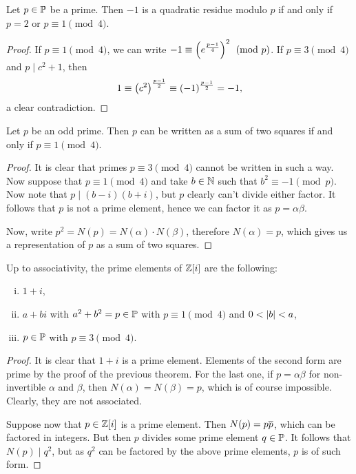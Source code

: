 \obvs

\begin{lema}
Let $p \in \P$ be a prime. Then $-1$ is a quadratic residue modulo
$p$ if and only if $p = 2$ or $p \equiv 1 \pmod{4}$.
\end{lema}

\begin{proof}
If $p \equiv 1 \pmod{4}$, we can write
$-1 \equiv \br{e^{\frac{p-1}{4}}}^2 \pmod{p}$.
If $p \equiv 3 \pmod{4}$ and $p \mid c^2 + 1$, then
\[
1 \equiv \br{c^2}^{\frac{p-1}{2}} \equiv (-1)^{\frac{p-1}{2}} = -1,
\]
a clear contradiction.
\end{proof}

\begin{izrek}[Fermat]
Let $p$ be an odd prime. Then $p$ can be written as a sum of two
squares if and only if $p \equiv 1 \pmod{4}$.
\end{izrek}

\begin{proof}
It is clear that primes $p \equiv 3 \pmod{4}$ cannot be written in
such a way. Now suppose that $p \equiv 1 \pmod{4}$ and take
$b \in \N$ such that $b^2 \equiv -1 \pmod{p}$. Now note that
$p \mid (b-i)(b+i)$, but $p$ clearly can't divide either factor. It
follows that $p$ is not a prime element, hence we can factor it as
$p = \alpha \beta$.

Now, write $p^2 = N(p) = N(\alpha) \cdot N(\beta)$, therefore
$N(\alpha) = p$, which gives us a representation of $p$ as a sum of
two squares.
\end{proof}

\begin{trditev}
Up to associativity, the prime elements of $\Z[i]$ are the
following:

\begin{enumerate}[i)]
\item $1 + i$,
\item $a + bi$ with $a^2 + b^2 = p \in \P$ with
$p \equiv 1 \pmod{4}$ and $0 < \abs{b} < a$,
\item $p \in \P$ with $p \equiv 3 \pmod{4}$.
\end{enumerate}
\end{trditev}

\begin{proof}
It is clear that $1+i$ is a prime element. Elements of the second
form are prime by the proof of the previous theorem. For the last
one, if $p = \alpha \beta$ for non-invertible $\alpha$ and $\beta$,
then $N(\alpha) = N(\beta) = p$, which is of course impossible.
Clearly, they are not associated.

Suppose now that $p \in \Z[i]$ is a prime element. Then
$N(p) = p \oline{p}$, which can be factored in integers. But then
$p$ divides some prime element $q \in \P$. It follows that
$N(p) \mid q^2$, but as $q^2$ can be factored by the above prime
elements, $p$ is of such form.
\end{proof}


